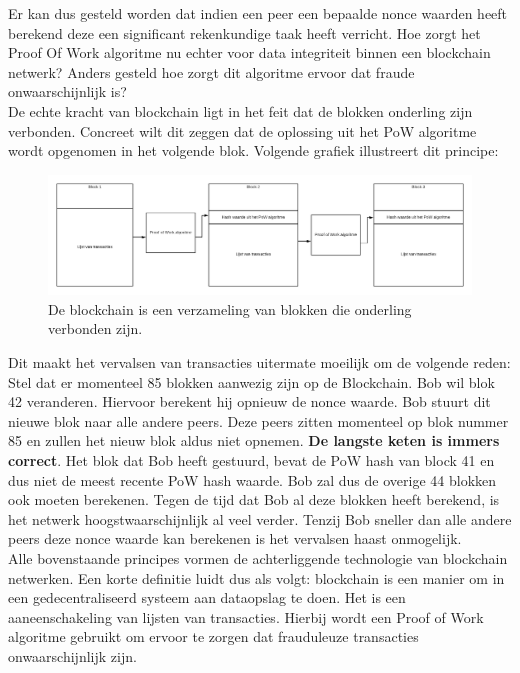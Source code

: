 Er kan dus gesteld worden dat indien een peer een bepaalde nonce waarden heeft berekend deze een significant rekenkundige taak heeft verricht. Hoe zorgt het Proof Of Work algoritme nu echter voor data integriteit binnen een blockchain netwerk? Anders gesteld hoe zorgt dit algoritme ervoor dat fraude onwaarschijnlijk is?\\

De echte kracht van blockchain ligt in het feit dat de blokken onderling zijn verbonden. Concreet wilt dit zeggen dat de oplossing uit het PoW algoritme wordt opgenomen in het volgende blok. Volgende grafiek illustreert dit principe:

\begin{figure}[h!]
	\centering
		\includegraphics[scale=0.2]{blockchain-4.png}
	\caption[Blockchain - Voorstelling 4]{De blockchain is een verzameling van blokken die onderling verbonden zijn.}
\end{figure}

Dit maakt het vervalsen van transacties uitermate moeilijk om de volgende reden:\\

Stel dat er momenteel 85 blokken aanwezig zijn op de Blockchain. Bob wil blok 42 veranderen. Hiervoor berekent hij opnieuw de nonce waarde. Bob stuurt dit nieuwe blok naar alle andere peers. Deze peers zitten momenteel op blok nummer 85 en zullen het nieuw blok aldus niet opnemen. \textbf{De langste keten is immers correct}. Het blok dat Bob heeft gestuurd, bevat de PoW hash van block 41 en dus niet de meest recente PoW hash waarde. Bob zal dus de overige 44 blokken ook moeten berekenen. Tegen de tijd dat Bob al deze blokken heeft berekend, is het netwerk hoogstwaarschijnlijk al veel verder. Tenzij Bob sneller dan alle andere peers deze nonce waarde kan berekenen is het vervalsen haast onmogelijk.\\

Alle bovenstaande principes vormen de achterliggende technologie van blockchain netwerken. Een korte definitie luidt dus als volgt: blockchain is een manier om in een gedecentraliseerd systeem aan dataopslag te doen. Het is een aaneenschakeling van lijsten van transacties. Hierbij wordt een Proof of Work algoritme gebruikt om ervoor te zorgen dat frauduleuze transacties onwaarschijnlijk zijn.

